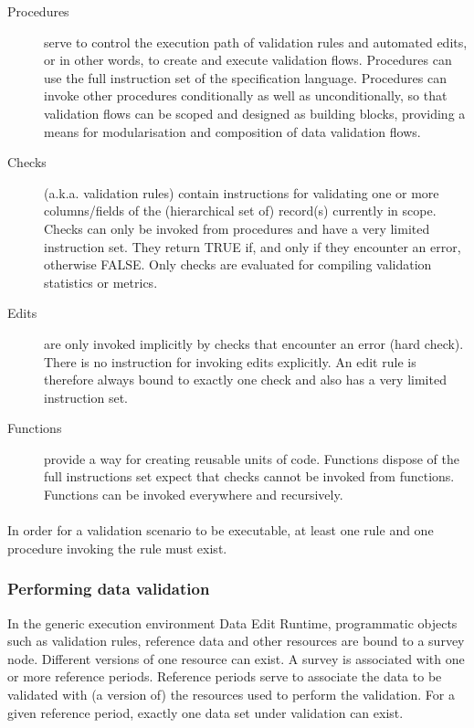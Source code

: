 \begin{description}

\item[Procedures] serve to control the execution path of validation rules and automated edits, or in other words, to create and execute validation flows. Procedures can use the full instruction set of the specification language. Procedures can invoke other procedures conditionally as well as unconditionally, so that validation flows can be scoped and designed as building blocks, providing a means for modularisation and composition of data validation flows.

\item[Checks](a.k.a. validation rules) contain instructions for validating one or more columns/fields of the (hierarchical set of) record(s) currently in scope. Checks can only be invoked from procedures and have a very limited instruction set. They return TRUE if, and only if they encounter an error, otherwise FALSE. Only checks are evaluated for compiling validation statistics or metrics.

\item[Edits] are only invoked implicitly by checks that encounter an error (hard check). There is no instruction for invoking edits explicitly. An edit rule is therefore always bound to exactly one check and also has a very limited instruction set.

\item[Functions] provide a way for creating reusable units of code. Functions dispose of the full instructions set expect that checks cannot be invoked from functions. Functions can be invoked everywhere and recursively.

\end{description}

\paragraph{}
In order for a validation scenario to be executable, at least one rule and one procedure invoking the rule must exist.

\subsubsection{Performing data validation}

In the generic execution environment Data Edit Runtime, programmatic objects such as validation rules, reference data and other resources are bound to a survey node. Different versions of one resource can exist. A survey is associated with one or more reference periods. Reference periods serve to associate the data to be validated with (a version of) the resources used to perform the validation. For a given reference period, exactly one data set under validation can exist.

